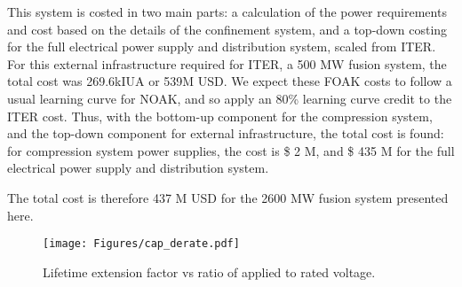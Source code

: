 
This system is costed in two main parts: a calculation of the power requirements and cost based on the details of the confinement system, and a top-down costing for the full electrical power supply and distribution system, scaled from ITER. For this external infrastructure required for ITER, a 500 MW fusion system, the total cost was 269.6kIUA or 539M USD. 
We expect these FOAK costs to follow a usual learning curve for NOAK, and so apply an 80\% learning curve credit to the ITER cost. Thus, with the bottom-up component for the compression system, and the top-down component for external infrastructure, the total cost is found: for compression system power supplies, the cost is \$ 2 M, and \$ 435 M for the full electrical power supply and distribution system. 

The total cost is therefore 437 M USD for the 2600 MW fusion system presented here. 

\begin{figure}[h!]
    \centering
    \texttt{[image: Figures/cap\_derate.pdf]}
    \caption{Lifetime extension factor vs ratio of applied to rated voltage.}
    \label{fig:derate}
\end{figure}




